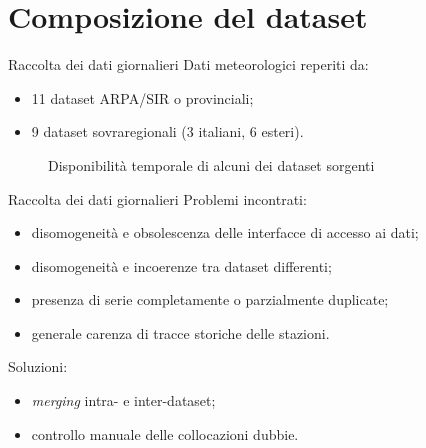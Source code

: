 
\section{Composizione del dataset}
\begin{frame}[t]{Raccolta dei dati giornalieri}
  Dati meteorologici reperiti da:
  \begin{itemize}
    \item 11 dataset ARPA/SIR o provinciali;
    \item 9 dataset sovraregionali (3 italiani, 6 esteri).
  \end{itemize}

  \begin{figure}
    \centering
    \small
    
    \caption*{Disponibilità temporale di alcuni dei dataset sorgenti}
  \end{figure}
\end{frame}

\begin{frame}{Raccolta dei dati giornalieri}
  Problemi incontrati:
  \begin{itemize}
    \item disomogeneità e obsolescenza delle interfacce di accesso ai dati;
    \item disomogeneità e incoerenze tra dataset differenti;
    \item presenza di serie completamente o parzialmente duplicate;
    \item generale carenza di tracce storiche delle stazioni.
  \end{itemize}
  Soluzioni:
  \begin{itemize}
    \item \emph{merging} intra- e inter-dataset;
    \item controllo manuale delle collocazioni dubbie.
  \end{itemize}
\end{frame}

